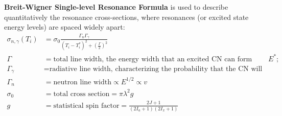 \documentclass{school-22.101-notes}
\begin{document}
\begin{enumerate}
\textbf{Breit-Wigner Single-level Resonance Formula} is used to describe quantitatively the resonance cross-sections, where resonances (or excited state energy levels) are spaced widely apart: 
\begin{align}
\sigma_{n, \gamma} (T_i) &= \sigma_0 \frac{\Gamma_n \Gamma_{\gamma}}{(T_i - T_i^*)^2 + \left( \frac{\Gamma}{2} \right)^2} \\
\Gamma &= \mbox{total line width, the energy width that an excited CN can form about $E^*$;} \\
\Gamma_{\gamma} &= \mbox{radiative line width, characterizing the probability that the CN will decay with gamma emission;} \\
\Gamma_n &= \mbox{neutron line width} \propto E^{1/2} \propto v \\
\sigma_0 &= \mbox{total cross section} = \pi \lambda^2 g \\
g &= \mbox{statistical spin factor} = \frac{2J + 1}{(2 I_a + 1) (2 I_x + 1)}
\end{align}


\end{enumerate}
\end{document}
